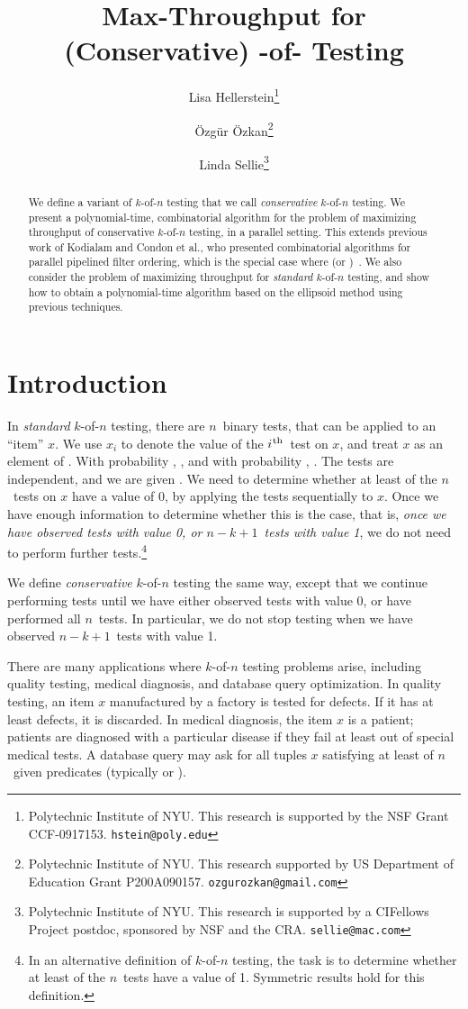 \documentclass{article}
\title{Max-Throughput for (Conservative) -of- Testing}
\author{Lisa Hellerstein\thanks{Polytechnic Institute of NYU. This research is supported by the NSF Grant CCF-0917153. {\tt hstein@poly.edu}}
 \and 
\"Ozg\"ur \"Ozkan\thanks{Polytechnic Institute of NYU. This research supported by US Department of Education Grant P200A090157. {\tt ozgurozkan@gmail.com}}
\and
Linda Sellie\thanks{Polytechnic Institute of NYU. This research is supported by a CIFellows Project postdoc, sponsored by NSF and the CRA. {\tt sellie@mac.com}}}
\newcommand{\ens}[1]{\ensuremath{#1}}					\newcommand{\card}[1]{\ens{|#1|}}							\newcommand{\dotlist}[2]{\ens{#1,\ldots,#2}}
\newcommand{\ith}{\ens{i^{\mbox{\hspace{.2mm}\scriptsize th}}}}
\newcommand{\anitem}{\ens{x}}
\newcommand{\valn}{\ens{n}}
\newcommand{\valk}{\ens{k}}
\newcommand{\valnmk}{\ens{\valn - \valk + 1}}
\newcommand{\kofn}{\valk-of-\valn}
\newcommand{\retval}[1]{\ens{\anitem_{#1}}}					\newcommand{\pr}[1]{\ens{p_{#1}}}									\newcommand{\qr}[1]{\ens{q_{#1}}}									\newcommand{\op}[1]{\ens{O_{#1}}}									\newcommand{\megaop}[1]{\ens{E_{#1}}}
\begin{document}
\maketitle


\begin{abstract}
We define a variant of \kofn{} testing
that we call {\em conservative} \kofn{} testing.
We present a polynomial-time, combinatorial algorithm for the
problem of maximizing throughput of
conservative \kofn{} testing, in
a parallel setting.  
This extends previous work of Kodialam and Condon et al., 
who presented combinatorial
algorithms for parallel pipelined filter ordering,
which is the special case where  (or )~\cite{conf/ipco/Kodialam01,conf/pods/CondonDHW06,journals/talg/CondonDHW09}.
We also consider the problem of maximizing throughput for 
{\em standard} \kofn{} testing, and show how to obtain a polynomial-time algorithm based on the ellipsoid method using previous techniques.
\end{abstract}






\section{Introduction}


In {\em standard} \kofn{} testing, there are \valn\ binary
tests, that can be applied to an ``item'' \anitem.  
We use \retval i to denote the value of the \ith\ test on \anitem, 
and treat \anitem{} as an
element of .
With probability ,
,  and with probability ,
.
The tests are independent, and we are given
.
We need to determine whether at least  of the \valn\ tests on \anitem{}
have a value of 0, by applying the tests
sequentially to \anitem.
Once we have enough
information to determine whether this is the case, that is, {\em once
we have observed  tests with value 0, or \valnmk\ tests with
value 1}, we do not need to perform further tests.\footnote{In an alternative definition of \kofn{} testing, the task is to determine whether at least  of the \valn\ tests have a value of 1.  Symmetric results hold for this definition.}

We define {\em conservative} \kofn{} testing the same way,
except that we continue performing tests
until we have either observed  tests with value 0,
or have performed all \valn\ tests.  In particular, we do not stop
testing when we have observed \valnmk\ tests with value 1.

There are many applications where \kofn{} testing problems
arise, including 
quality testing, medical diagnosis, and database query optimization.
In quality testing, an item \anitem{} manufactured by a factory is tested for defects.  If it has at least  defects, it is discarded.  
In medical diagnosis, the item \anitem{} is a patient;
patients are diagnosed with a particular disease if they fail at least
 out of  special medical tests. 
A database query may ask 
for all tuples \anitem{} satisfying at least  of \valn\ given predicates (typically  or ).
\end{document}
